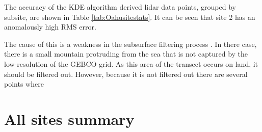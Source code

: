 The accuracy of the KDE algorithm derived lidar data points, grouped by subsite, are shown in Table \ref{tab:Oahusitestats}. It can be seen that site 2 has an anomalously high RMS error. 


\begin{figure}
    \begin{floatrow}
    \end{floatrow}
\end{figure}


The cause of this is a weakness in the subsurface filtering process . In there case, there is a small mountain protruding from the sea that is not captured by the low-resolution of the GEBCO grid. As this area of the transect occurs on land, it should be filtered out. However, because it is not filtered out there are several points where 

\section{All sites summary}



